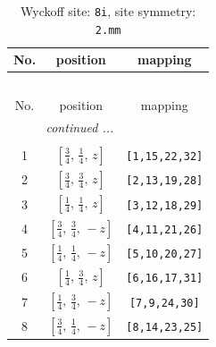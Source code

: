 \documentclass[fleqn,8pt]{jsarticle}
\begin{document}
\renewcommand{\arraystretch}{1.2}
\begin{longtable}{ccc}
\caption{Wyckoff site: {\tt 8i}, site symmetry: {\tt 2.mm}}
 \\
 \hline \hline
No. & position & mapping \\ \hline \endfirsthead

\multicolumn{2}{l}{\tablename\ \thetable{}} \\
 \hline \hline
No. & position & mapping \\ \hline \endhead

 \hline \hline
\multicolumn{2}{r}{\footnotesize\it continued ...} \\ \endfoot

 \hline \hline
\multicolumn{2}{r}{} \\ \endlastfoot

1 & $\left[ \frac{3}{4},\, \frac{1}{4},\, z \right]$ & {\tt [1,15,22,32]} \\ \hline
2 & $\left[ \frac{3}{4},\, \frac{3}{4},\, z \right]$ & {\tt [2,13,19,28]} \\ \hline
3 & $\left[ \frac{1}{4},\, \frac{1}{4},\, z \right]$ & {\tt [3,12,18,29]} \\ \hline
4 & $\left[ \frac{3}{4},\, \frac{3}{4},\, - z \right]$ & {\tt [4,11,21,26]} \\ \hline
5 & $\left[ \frac{1}{4},\, \frac{1}{4},\, - z \right]$ & {\tt [5,10,20,27]} \\ \hline
6 & $\left[ \frac{1}{4},\, \frac{3}{4},\, z \right]$ & {\tt [6,16,17,31]} \\ \hline
7 & $\left[ \frac{1}{4},\, \frac{3}{4},\, - z \right]$ & {\tt [7,9,24,30]} \\ \hline
8 & $\left[ \frac{3}{4},\, \frac{1}{4},\, - z \right]$ & {\tt [8,14,23,25]} \\
\end{longtable}
\renewcommand{\arraystretch}{1.2}
\end{document}
